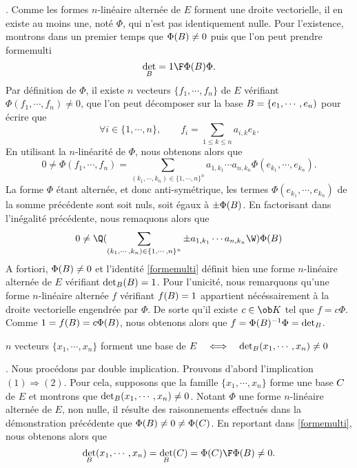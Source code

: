 \Demonstration. Comme les formes $n$-lin\'eaire altern\'ee de $E$ forment une droite vectorielle, il en existe au moins une, not\'e $\Phi$, qui n'est pas identiquement nulle. \pn
Pour l'existence, montrons dans un premier temps que $\Phi(\sc B)\neq0$ puis que l'on peut prendre 
\Equation [*] formemulti
$$
\det_{\sc B}={1\F \Phi(\sc B)}\Phi. 
$$ 
Par d\'efinition de $\Phi$, il existe $n$ vecteurs $\{f_1,\cdots, f_n\}$ de $E$ v\'erifiant $\Phi(f_1, \cdots, f_n)\neq0$, que l'on peut d\'ecomposer sur la base $\sc B=\{e_1, \cdots, e_n)$ pour \'ecrire que 
$$
\forall i\in\{1,\cdots, n\}, \qquad f_i=\sum\limits_{1\le k\le n}a_{i,k}e_k.
$$
En utilisant la $n$-lin\'earit\'e de $\Phi$, nous obtenons alors que 
$$
0\neq\Phi(f_1, \cdots, f_n)=\sum\limits_{(k_1,\cdots, k_n)\in\{1,\cdots, n\}^n}a_{1, k_1}\cdots a_{n,k_n}\Phi(e_{k_1}, \cdots, e_{k_n}).
$$
La forme $\Phi$ \'etant altern\'ee, et donc anti-sym\'etrique, les termes $\Phi(e_{k_1}, \cdots, e_{k_n})$ de la somme pr\'ec\'edente sont soit nuls, soit \'egaux \`a $\pm\Phi(\sc B)$. 
En factorisant dans l'in\'egalit\'e pr\'ec\'edente, nous remaquons alors que 
$$
0\neq \Q(\sum\limits_{(k_1,\cdots, k_n)\in\{1,\cdots, n\}^n}\pm a_{1, k_1}\cdots a_{n,k_n}\W)\Phi(\sc B)
$$
A fortiori, $\Phi(\sc B)\neq0$ et l'identit\'e \eqref{formemulti} d\'efinit bien une forme $n$-lin\'eaire altern\'ee de $E$ v\'erifiant $\det_{\sc B}(\sc B)=1$. \pn
Pour l'unicit\'e, nous remarquons qu'une forme $n$-lin\'eaire altern\'ee $f$ v\'erifiant $f(\sc B)=1$ appartient n\'ec\'essairement \`a la droite vectorielle engendr\'ee par $\Phi$. De sorte qu'il existe $c\in\ob K$ tel que $f=c\Phi$. Comme $1=f(\sc B)=c\Phi(\sc B)$, nous obtenons alors que $f=\Phi(\sc B)^{-1}\Phi=\det_{\sc B}$. 
\CQFD



$n$ vecteurs  $\{x_1, \cdots, x_n\}$ forment une base de $E \quad\Longleftrightarrow\quad \det_{\sc B}(x_1, \cdots, x_n)\neq0$

\Demonstration. Nous proc\'edons par double implication. \smallskip
Prouvons d'abord l'implication $(1)\Rightarrow(2)$. Pour cela, supposons que la famille $\{x_1, \cdots, x_n\}$ forme une base $\sc C$ de $E$ et montrons que $\det_{\sc B}(x_1, \cdots, x_n)\neq0$. \pn
Notant $\Phi$ une forme $n$-lin\'eaire altern\'ee de $E$, non nulle, il r\'esulte des raisonnements effectu\'es dans la d\'emonstration pr\'ec\'edente que $\Phi(\sc B)\neq 0\neq\Phi(\sc C)$. En reportant dans \eqref{formemulti}, nous obtenons alors que 
$$
\det_{\sc B}(x_1, \cdots, x_n)=\det_{\sc B}(\sc C)={\Phi(\sc C)\F \Phi(\sc B)}\neq0.
$$

